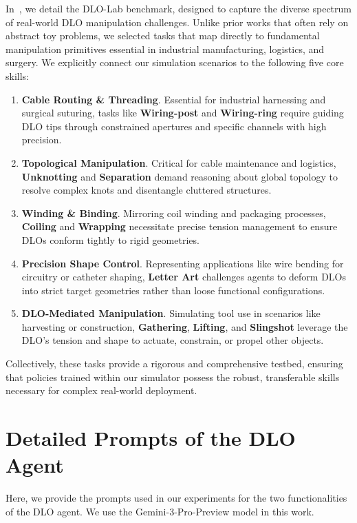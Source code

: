 In~, we detail the DLO-Lab benchmark, designed to capture the diverse spectrum of real-world DLO manipulation challenges. Unlike prior works that often rely on abstract toy problems, we selected tasks that map directly to fundamental manipulation primitives essential in industrial manufacturing, logistics, and surgery. We explicitly connect our simulation scenarios to the following five core skills:
\begin{enumerate}[align=right,itemindent=0em,labelsep=2pt,labelwidth=1em,leftmargin=*,itemsep=0em] 
    \item \textbf{Cable Routing \& Threading}. Essential for industrial harnessing and surgical suturing, tasks like \textbf{Wiring-post} and \textbf{Wiring-ring} require guiding DLO tips through constrained apertures and specific channels with high precision.
    \item \textbf{Topological Manipulation}. Critical for cable maintenance and logistics, \textbf{Unknotting} and \textbf{Separation} demand reasoning about global topology to resolve complex knots and disentangle cluttered structures.
    \item \textbf{Winding \& Binding}. Mirroring coil winding and packaging processes, \textbf{Coiling} and \textbf{Wrapping} necessitate precise tension management to ensure DLOs conform tightly to rigid geometries.
    \item \textbf{Precision Shape Control}. Representing applications like wire bending for circuitry or catheter shaping, \textbf{Letter Art} challenges agents to deform DLOs into strict target geometries rather than loose functional configurations.
    \item \textbf{DLO-Mediated Manipulation}. Simulating tool use in scenarios like harvesting or construction, \textbf{Gathering}, \textbf{Lifting}, and \textbf{Slingshot} leverage the DLO's tension and shape to actuate, constrain, or propel other objects.
\end{enumerate}
Collectively, these tasks provide a rigorous and comprehensive testbed, ensuring that policies trained within our simulator possess the robust, transferable skills necessary for complex real-world deployment.


\section{Detailed Prompts of the DLO Agent}
\label{sec:details_dlo_agent}

Here, we provide the prompts used in our experiments for the two functionalities of the DLO agent. We use the Gemini-3-Pro-Preview model in this work.

